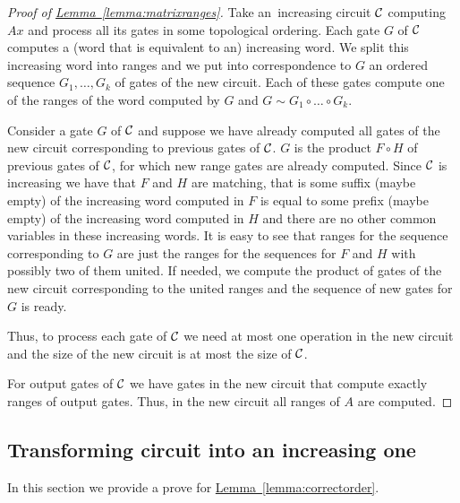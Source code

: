 \documentclass[11pt]{article}
\numberwithin{equation}{section}
\theoremstyle{definition}
\theoremstyle{plain}
\newcommand{\expref}[2]{\hyperref[#2]{#1~\ref{#2}}}
\theoremstyle{plain}\newtheorem{observation}[theorem]{Observation}
\begin{document}
\begin{proof}[Proof of {\expref{Lemma}{lemma:matrixranges}}]
    Take an~increasing circuit ${\cal C}$ computing $Ax$ and process all its gates in some topological ordering. Each gate $G$ of ${\cal C}$ computes a (word that is equivalent to an) increasing word. We split this increasing word into ranges and we put into correspondence to $G$ an ordered sequence $G_1,\ldots, G_k$ of gates of the new circuit. Each of these gates compute one of the ranges of the word computed by $G$ and $G \sim G_1\circ\ldots \circ G_k$.

    Consider a gate $G$ of ${\cal C}$ and suppose we have already computed all gates of the new circuit corresponding to previous gates of ${\cal C}$. $G$ is the product $F \circ H$ of previous gates of ${\cal C}$, for which new range gates are already computed. Since ${\cal C}$ is increasing we have that $F$ and $H$ are matching, that is some suffix (maybe empty) of the increasing word computed in $F$ is equal to some prefix (maybe empty) of the increasing word computed in $H$ and there are no other common variables in these increasing words. It is easy to see that ranges for the sequence corresponding to $G$ are just the ranges for the sequences for $F$ and $H$ with possibly two of them united. If needed, we compute the product of gates of the new circuit corresponding to the united ranges and the sequence of new gates for $G$ is ready.

    Thus, to process each gate of ${\cal C}$ we need at most one operation in the new circuit and the size of the new circuit is at most the size of ${\cal C}$.

    For output gates of ${\cal C}$ we have gates in the new circuit that compute exactly ranges of output gates. Thus, in the new circuit all ranges of $A$ are computed.
\end{proof}

%

%
%

%

%

%

%
%


\subsection{Transforming circuit into an increasing one}
\label{sec:increasing_circuits}

%
In this section we provide a prove for \expref{Lemma}{lemma:correctorder}.
%
\end{document}
